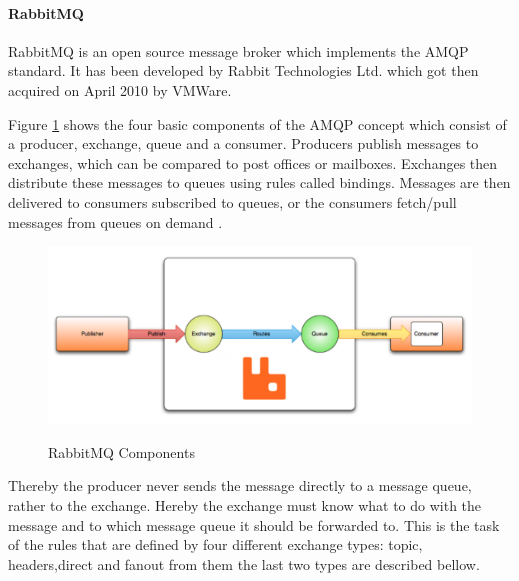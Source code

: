 \paragraph{RabbitMQ}

RabbitMQ is an open source message broker which implements the \ac{AMQP} standard. It has been developed by Rabbit Technologies Ltd. which got then acquired on April 2010 by VMWare.

Figure \ref{fig:rabbit_mq} shows the four basic components of the \ac{AMQP} concept which consist of a producer, exchange, queue and a consumer. Producers publish messages to exchanges, which can be compared to post offices or mailboxes. Exchanges then distribute these messages to queues using rules called bindings. Messages are then delivered to consumers subscribed to queues, or the consumers fetch/pull messages from queues on demand \cite{amqp-concepts}.
\begin{figure}[htb]
  \centering
  \includegraphics[scale=0.6]{rabbit_mq.png}\\
  \caption{RabbitMQ Components}
  \label{fig:rabbit_mq}
  \protect\cite{amqp-concepts}
\end{figure}

Thereby the producer never sends the message directly to a message queue, rather to the exchange. Hereby the exchange must know what to do with the message and to which message queue it should be forwarded to. This is the task of the rules that are defined by four different exchange types:  topic, headers,direct and fanout from them the last two types are described bellow.

